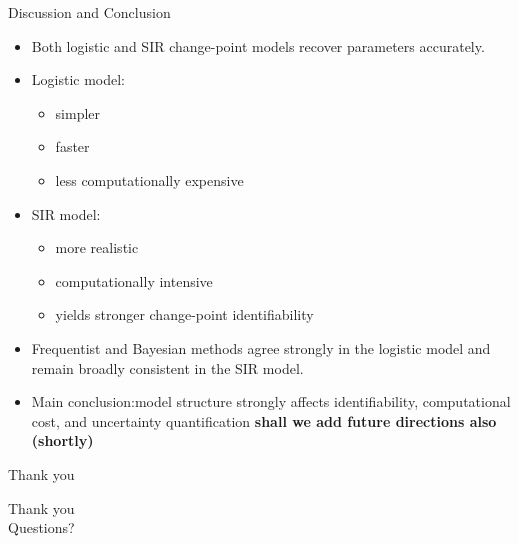 \documentclass[
  ignorenonframetext,
  aspectratio=169,
]{beamer}
\providecommand{\tightlist}{%
  \setlength{\itemsep}{0pt}\setlength{\parskip}{0pt}}\usepackage{longtable,booktabs,array}
\begin{document}
\begin{frame}{Discussion and Conclusion}
\label{discussion-and-conclusion}
\begin{itemize}
\tightlist
\item
  Both logistic and SIR change-point models recover parameters
  accurately.
\item
  Logistic model:

  \begin{itemize}
  \tightlist
  \item
    simpler
  \item
    faster
  \item
    less computationally expensive
  \end{itemize}
\item
  SIR model:

  \begin{itemize}
  \tightlist
  \item
    more realistic
  \item
    computationally intensive
  \item
    yields stronger change-point identifiability
  \end{itemize}
\item
  Frequentist and Bayesian methods agree strongly in the logistic model
  and remain broadly consistent in the SIR model.
\item
  Main conclusion:model structure strongly affects identifiability,
  computational cost, and uncertainty quantification \textbf{shall we
  add future directions also (shortly)}
\end{itemize}
\end{frame}

\begin{frame}{Thank you}
\label{thank-you}
\begin{center}
\Large Thank you\\[0.5em]
\large Questions?
\end{center}
\end{frame}
\end{document}
